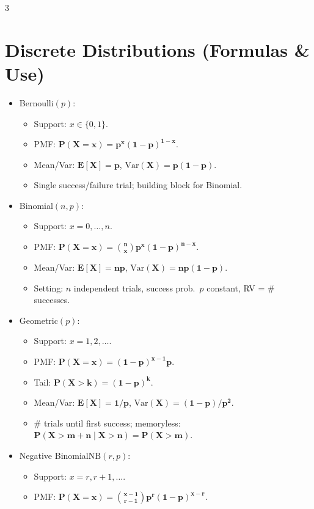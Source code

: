 \documentclass[11pt,landscape]{article}
\begin{document}
\begin{multicols}{3}
\section{Discrete Distributions (Formulas \& Use)}
\begin{itemize}
  \item Bernoulli$(p)$:
    \begin{itemize}
      \item Support: $x\in\{0,1\}$.
      \item PMF: $\mathbf{P(X=x)=p^x(1-p)^{1-x}}$.
      \item Mean/Var: $\mathbf{E[X]=p}$, $\mathbf{\mathrm{Var}(X)=p(1-p)}$.
      \item Single success/failure trial; building block for Binomial.
    \end{itemize}
  \item Binomial$(n,p)$:
    \begin{itemize}
      \item Support: $x=0,\dots,n$.
      \item PMF: $\mathbf{P(X=x)=\binom{n}{x}p^x(1-p)^{n-x}}$.
      \item Mean/Var: $\mathbf{E[X]=np}$, $\mathbf{\mathrm{Var}(X)=np(1-p)}$.
      \item Setting: $n$ independent trials, success prob.\ $p$ constant, RV = \# successes.
    \end{itemize}
  \item Geometric$(p)$:
    \begin{itemize}
      \item Support: $x=1,2,\dots$.
      \item PMF: $\mathbf{P(X=x)=(1-p)^{x-1}p}$.
      \item Tail: $\mathbf{P(X>k)=(1-p)^k}$.
      \item Mean/Var: $\mathbf{E[X]=1/p}$, $\mathbf{\mathrm{Var}(X)=(1-p)/p^2}$.
      \item \# trials until first success; memoryless: $\mathbf{P(X>m+n\mid X>n)=P(X>m)}$.
    \end{itemize}
  \item Negative Binomial$\text{NB}(r,p)$:
    \begin{itemize}
      \item Support: $x=r,r+1,\dots$.
      \item PMF: $\mathbf{P(X=x)=\binom{x-1}{r-1}p^r(1-p)^{x-r}}$.

\end{itemize}
\end{itemize}
\end{multicols}
\end{document}
